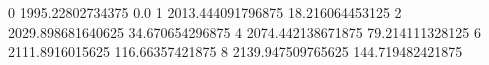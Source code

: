 0 1995.22802734375 0.0
1 2013.444091796875 18.216064453125
2 2029.898681640625 34.670654296875
4 2074.442138671875 79.214111328125
6 2111.8916015625 116.66357421875
8 2139.947509765625 144.719482421875
